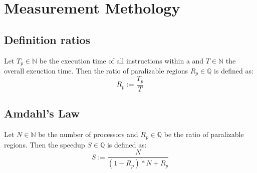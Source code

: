 \section{Measurement Methology}
\subsection{Definition ratios}
Let \(T_p\in\mathbb{N}\) be the execution time of all instructions within a \scop and \(T\in\mathbb{N}\) the overall exeuction time.
Then the ratio of paralizable regions \(R_p\in\mathbb{Q}\) is defined as:
\[R_p := \frac{T_p}{T}\]

\subsection[Amdahl's Law]{Amdahl's Law \cite{AmdahlsLaw}}
Let \(N\in\mathbb{N}\) be the number of processors and \(R_p\in\mathbb{Q}\) be the ratio of paralizable regions.
Then the speedup \(S\in\mathbb{Q}\) is defined as:
\[S := \frac{N}{(1-R_p)*N+R_p}\]
\begin{comment}
    \subsection[Amdahl's Law Jenkov]{Amdahl's Law Jenkov \cite{AmdahlsLawJenkov}}
    Let \(T\in\mathbb{Q}\) be the overall execution time, \(B\in\mathbb{Q}\) the execution time of the non-paralizable parts and \(N\in\mathbb{N}\) the number of processors.
    Then the speedup \(S\in\mathbb{Q}\) is defined as:
    \[S(B) := B+\frac{T-B}{N}\]
\end{comment}

